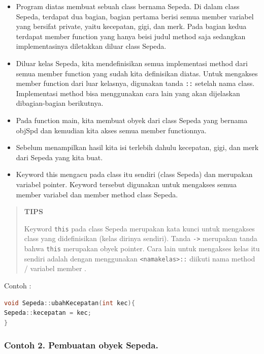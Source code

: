 \begin{itemize}
\tightlist
\item
  Program diatas membuat sebuah class bernama Sepeda. Di dalam class
  Sepeda, terdapat dua bagian, bagian pertama berisi semua member
  variabel yang bersifat private, yaitu kecepatan, gigi, dan merk. Pada
  bagian kedua terdapat member function yang hanya beisi judul method
  saja sedangkan implementasinya diletakkan diluar class Sepeda.
\item
  Diluar kelas Sepeda, kita mendefinisikan semua implementasi method
  dari semua member function yang sudah kita definisikan diatas. Untuk
  mengakses member function dari luar kelasnya, digunakan tanda
  \texttt{::} setelah nama class. Implementasi method bisa menggunakan
  cara lain yang akan dijelaskan dibagian-bagian berikutnya.
\item
  Pada function main, kita membuat obyek dari class Sepeda yang bernama
  objSpd dan kemudian kita akses semua member functionnya.
\item
  Sebelum menampilkan hasil kita isi terlebih dahulu kecepatan, gigi,
  dan merk dari Sepeda yang kita buat.
\item
  Keyword this mengacu pada class itu sendiri (class Sepeda) dan
  merupakan variabel pointer. Keyword tersebut digunakan untuk mengakses
  semua member variabel dan member method class Sepeda.
\end{itemize}
\begin{quotation}
	\textbf{TIPS} 
	
	Keyword
	\texttt{this} pada class Sepeda merupakan kata kunci untuk mengakses
	class yang didefinisikan (kelas dirinya sendiri). Tanda
	\texttt{-\textgreater{}} merupakan tanda bahwa \texttt{this} merupakan
	obyek pointer. Cara lain untuk mengakses kelas itu sendiri adalah dengan
	menggunakan \texttt{\textless{}namakelas\textgreater{}::} diikuti nama
	method / variabel member .
\end{quotation}
 
 
  

Contoh :

\begin{lstlisting}[language=c++]
void Sepeda::ubahKecepatan(int kec){
Sepeda::kecepatan = kec;
}
\end{lstlisting}

\subsubsection*{Contoh 2. Pembuatan obyek Sepeda.}

